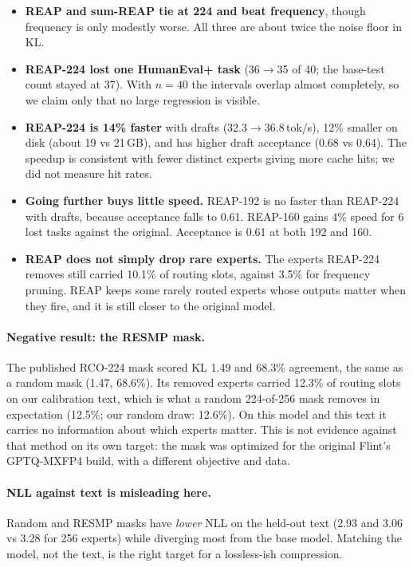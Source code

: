 \documentclass[11pt]{article}
\newcommand{\tps}{tok/s}
\begin{document}
\begin{itemize}
  \item \textbf{REAP and sum-REAP tie at 224 and beat frequency}, though frequency is only modestly worse. All three are
        about twice the noise floor in KL.
  \item \textbf{REAP-224 lost one HumanEval+ task} (36$\to$35 of 40; the base-test count stayed at 37). With $n{=}40$ the
        intervals overlap almost completely, so we claim only that no large regression is visible.
  \item \textbf{REAP-224 is 14\% faster} with drafts (32.3$\to$36.8\,\tps{}), 12\% smaller on disk (about 19 vs 21\,GB),
        and has higher draft acceptance (0.68 vs 0.64). The speedup is consistent with fewer distinct experts giving more
        cache hits; we did not measure hit rates.
  \item \textbf{Going further buys little speed.} REAP-192 is no faster than REAP-224 with drafts, because acceptance
        falls to 0.61. REAP-160 gains 4\% speed for 6 lost tasks against the original. Acceptance is 0.61 at both 192
        and 160.
  \item \textbf{REAP does not simply drop rare experts.} The experts REAP-224 removes still carried 10.1\% of routing slots,
        against 3.5\% for frequency pruning. REAP keeps some rarely routed experts whose outputs matter when they fire, and
        it is still closer to the original model.
\end{itemize}

\paragraph{Negative result: the RESMP mask.} The published RCO-224 mask scored KL 1.49 and 68.3\% agreement, the same as a
random mask (1.47, 68.6\%). Its removed experts carried 12.3\% of routing slots on our calibration text, which is what a
random 224-of-256 mask removes in expectation (12.5\%; our random draw: 12.6\%). On this model and this text it carries no
information about which experts matter. This is not evidence against that method on its own target: the mask was
optimized for the original Flint's GPTQ-MXFP4 build, with a different objective and data.

\paragraph{NLL against text is misleading here.} Random and RESMP masks have \emph{lower} NLL on the held-out text
(2.93 and 3.06 vs 3.28 for 256 experts) while diverging most from the base model. Matching the model, not the text, is the right target for a lossless-ish compression.
\end{document}
